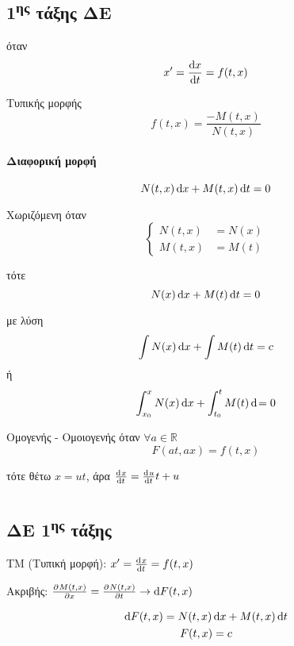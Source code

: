\documentclass[11pt,a4paper,titlepage,final]{article}
\begin{document}
\subsection{1\textsuperscript{ης} τάξης ΔΕ}
\begin{defn}{}{}
όταν
\[
x' = \frac{\dif x}{\dif t} = f(t,x)
\]

\begin{defn}{Τυπικής μορφής}{}
\[
f(t,x) = \frac{-M(t,x)}{N(t,x)}
\]

\paragraph{Διαφορική μορφή}
\[N(t,x) \dif x + M(t,x) \dif t = 0 \]

\begin{defn}{Χωριζόμενη}{}
όταν
\[
\begin{cases}
N(t,x) &= N(x) \\
M(t,x) &= M(t)
\end{cases}
\]

τότε
\[
N(x) \dif x + M(t) \dif t = 0
\]

με λύση
\[
\int N(x) \dif x + \int M(t) \dif t = c
\]
ή
\[
\int_{x_0}^x N(x) \dif x + \int_{t_0}^t M(t) \dif = 0
\]
\end{defn}

\begin{defn}{Ομογενής - Ομοιογενής}{}
όταν \(\forall a \in  \mathbb R\)
\[
F(at,ax)=f(t,x)
\]

τότε θέτω \(x = ut\), άρα \(\od{x}{t}=\od{u}{t}t+u\)
\end{defn}


\end{defn}
\end{defn}


\section{}




\subsection{ΔΕ 1\textsuperscript{ης} τάξης}
ΤΜ (Τυπική μορφή): \(x' = \od{x}{t} = f(t,x)\)


Ακριβής: \(
\pd{M(t,x)}{x}=\pd{N(t,x)}{t} \rightarrow \dif F(t,x)
\)

\begin{gather*}
\dif F(t,x) = N(t,x) \dif x + M(t,x) \dif t
\\ F(t,x)=c
\end{gather*}
\end{document}
